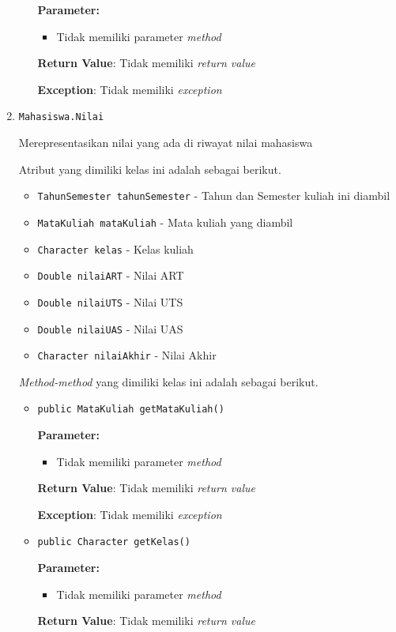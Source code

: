 \documentclass{article}
\begin{document}
\begin{enumerate}
\begin{itemize}
\textbf{Parameter:}
\begin{itemize}
\item Tidak memiliki parameter \textit{method}
\end{itemize}
\textbf{Return Value}: Tidak memiliki \textit{return value}

\textbf{Exception}: Tidak memiliki \textit{exception}

\end{itemize}
\item \texttt{Mahasiswa.Nilai}

Merepresentasikan nilai yang ada di riwayat nilai mahasiswa

Atribut yang dimiliki kelas ini adalah sebagai berikut.
\begin{itemize}
\item \texttt{TahunSemester tahunSemester} - Tahun dan Semester kuliah ini diambil
\item \texttt{MataKuliah mataKuliah} - Mata kuliah yang diambil
\item \texttt{Character kelas} - Kelas kuliah
\item \texttt{Double nilaiART} - Nilai ART
\item \texttt{Double nilaiUTS} - Nilai UTS
\item \texttt{Double nilaiUAS} - Nilai UAS
\item \texttt{Character nilaiAkhir} - Nilai Akhir
\end{itemize}
\textit{Method-method} yang dimiliki kelas ini adalah sebagai berikut.
\begin{itemize}
\item \texttt{public MataKuliah getMataKuliah()}



\textbf{Parameter:}
\begin{itemize}
\item Tidak memiliki parameter \textit{method}
\end{itemize}
\textbf{Return Value}: Tidak memiliki \textit{return value}

\textbf{Exception}: Tidak memiliki \textit{exception}

\item \texttt{public Character getKelas()}



\textbf{Parameter:}
\begin{itemize}
\item Tidak memiliki parameter \textit{method}
\end{itemize}
\textbf{Return Value}: Tidak memiliki \textit{return value}


\end{itemize}
\end{enumerate}
\end{document}
